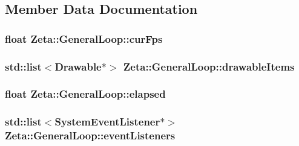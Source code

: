 \subsection{Member Data Documentation}
\hypertarget{classZeta_1_1GeneralLoop_a4d4c7e4a92bc9ec7d3cc0a75a0dd7371}{
\subsubsection[{cur\+Fps}]{\setlength{\rightskip}{0pt plus 5cm}float Zeta\+::\+General\+Loop\+::cur\+Fps\hspace{0.3cm}{\ttfamily [private]}}}\label{classZeta_1_1GeneralLoop_a4d4c7e4a92bc9ec7d3cc0a75a0dd7371}
\hypertarget{classZeta_1_1GeneralLoop_a20d3c4bcc87b4885636e29efd45b196e}{
\subsubsection[{drawable\+Items}]{\setlength{\rightskip}{0pt plus 5cm}std\+::list$<${\bf Drawable}$\ast$$>$ Zeta\+::\+General\+Loop\+::drawable\+Items\hspace{0.3cm}{\ttfamily [private]}}}\label{classZeta_1_1GeneralLoop_a20d3c4bcc87b4885636e29efd45b196e}
\hypertarget{classZeta_1_1GeneralLoop_a3f81a307d14ee0944a74c4e1fc9737a4}{
\subsubsection[{elapsed}]{\setlength{\rightskip}{0pt plus 5cm}float Zeta\+::\+General\+Loop\+::elapsed\hspace{0.3cm}{\ttfamily [private]}}}\label{classZeta_1_1GeneralLoop_a3f81a307d14ee0944a74c4e1fc9737a4}
\hypertarget{classZeta_1_1GeneralLoop_a30eda9d355645737c2c4bd8e30f9eb43}{
\subsubsection[{event\+Listeners}]{\setlength{\rightskip}{0pt plus 5cm}std\+::list$<${\bf System\+Event\+Listener}$\ast$$>$ Zeta\+::\+General\+Loop\+::event\+Listeners\hspace{0.3cm}{\ttfamily [private]}}}\label{classZeta_1_1GeneralLoop_a30eda9d355645737c2c4bd8e30f9eb43}
